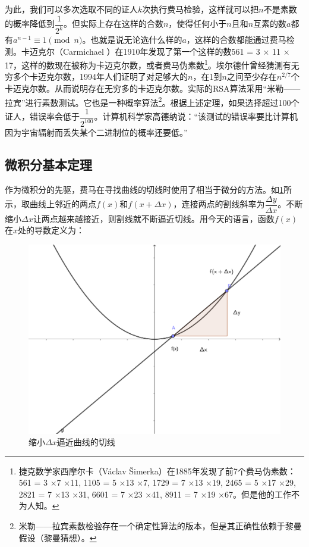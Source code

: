 \documentclass[b5paper]{ctexart}
\begin{document}
为此，我们可以多次选取不同的证人$k$次执行费马检验，这样就可以把$n$不是素数的概率降低到$\dfrac{1}{2^k}$。但实际上存在这样的合数$n$，使得任何小于$n$且和$n$互素的数$a$都有$a^{n-1} \equiv 1 \pmod n$。也就是说无论选什么样的$a$，这样的合数都能通过费马检测。卡迈克尔（Carmichael ）在1910年发现了第一个这样的数561 = 3 $\times$ 11 $\times$ 17，这样的数现在被称为卡迈克尔数，或者费马伪素数\footnote{捷克数学家西摩尔卡（Václav Šimerka）在1885年发现了前7个费马伪素数：561 = 3 $\times$7 $\times$11, 1105 = 5 $\times$13 $\times$7, 1729 = 7 $\times$13 $\times$19, 2465 = 5 $\times$17 $\times$29, 2821 = 7 $\times$13 $\times$31, 6601 = 7 $\times$23 $\times$41, 8911 = 7 $\times$19 $\times$67。但是他的工作不为人知。}。埃尔德什曾经猜测有无穷多个卡迈克尔数，1994年人们证明了对足够大的$n$，在1到$n$之间至少存在$n^{2/7}$个卡迈克尔数。从而说明存在无穷多的卡迈克尔数\cite{Wiki-Carmichael-number}。实际的RSA算法采用“米勒——拉宾”进行素数测试。它也是一种概率算法\footnote{米勒——拉宾素数检验存在一个确定性算法的版本，但是其正确性依赖于黎曼假设（黎曼猜想）\cite{Wiki-Miller-Rabin}。}。根据上述定理，如果选择超过100个证人，错误率会低于$\dfrac{1}{2^{100}}$。计算机科学家高德纳说：“该测试的错误率要比计算机因为宇宙辐射而丢失某个二进制位的概率还要低。”

\subsection{微积分基本定理}
作为微积分的先驱，费马在寻找曲线的切线时使用了相当于微分的方法。如\cref{fig:tagent}所示，取曲线上邻近的两点$f(x)$和$f(x + \Delta x)$，连接两点的割线斜率为$\dfrac{\Delta y}{\Delta x}$。不断缩小$\Delta x$让两点越来越接近，则割线就不断逼近切线。用今天的语言，函数$f(x)$在$x$处的导数定义为：

\begin{figure}[htbp]
 \centering
 \includegraphics[scale=0.4]{img/tagent}
 \caption{缩小$\Delta x$逼近曲线的切线}
 \label{fig:tagent}
\end{figure}
\end{document}
